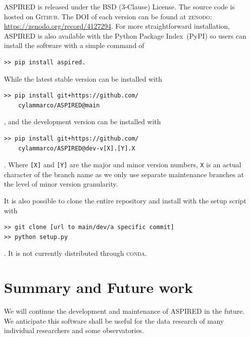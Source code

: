 \documentclass[linenumbers, twocolumn]{aastex631}
\begin{document}
\textsc{ASPIRED} is released under the BSD (3-Clause) License. The source code
is hosted on \textsc{Github}. The DOI of each version can be found at 
\textsc{zenodo}: \url{https://zenodo.org/record/4127294}. For more
straightforward installation, \textsc{ASPIRED} is also available with the
Python Package Index~(PyPI) so users can install the software with a simple
command of 
\begin{verbatim}
>> pip install aspired.
\end{verbatim}
While the latest stable version can be installed with
\begin{verbatim}
>> pip install git+https://github.com/
    cylammarco/ASPIRED@main
\end{verbatim},
and the development version can be installed with 
\begin{verbatim}
>> pip install git+https://github.com/
    cylammarco/ASPIRED@dev-v[X].[Y].X
\end{verbatim}. Where \verb+[X]+ and \verb+[Y]+ are the major and minor
version numbers, \verb+X+ is an actual character of the branch name as we only
use separate maintenance branches at the level of minor version granularity.

It is also possible to clone the entire repository
and install with the setup script with
\begin{verbatim}
>> git clone [url to main/dev/a specific commit]
>> python setup.py
\end{verbatim}
. It is not currently distributed through \textsc{conda}.

\section{Summary and Future work}
\label{sec:summary}

We will continue the development and maintenance of \textsc{ASPIRED} in the
future. We anticipate this software shall be useful for the data research of
many individual researchers and some observatories.
\end{document}
